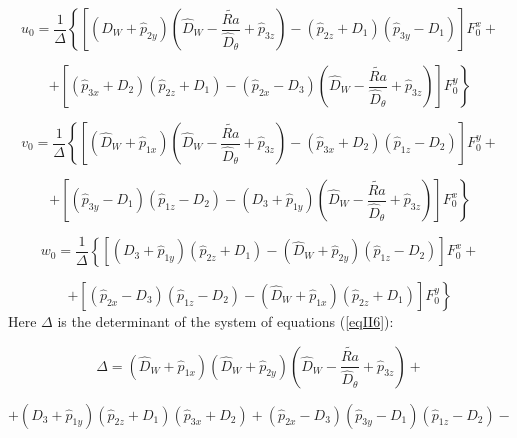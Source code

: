\documentclass [12pt]{article}
\begin{document}
\[u_{0} =\frac{1}{\Delta } \left\{ \left[\left(\widehat{D}_{W} +\widehat{p}_{2y} \right)\left(\widehat{D}_{W} -\frac{\widetilde{Ra}
 }{\widehat{D}_{\theta} } +\widehat{p}_{3z} \right)-
\left(\widehat{p}_{2z} +D_{1} \right)\left(\widehat{p}_{3y} -D_{1} \right)\right]F_{0}^{x}
\right. +  \]

\begin{equation} \label{eqII8}
 \left.{+ \left[\left(\widehat{p}_{3x} +D_{2} \right)\left(\widehat{p}_{2z} +D_{1} \right)-
\left(\widehat{p}_{2x} -D_{3} \right)\left(\widehat{D}_{W} -\frac{\widetilde{Ra}}{\widehat{D}_{\theta} } +\widehat{p}_{3z} \right) \right]F_{0}^{y}
} \right\}
\end{equation}

\[ v_{0} =\frac{1}{\Delta } \left\{ \left[\left(\widehat{D}_{W}+\widehat{p}_{1x} \right)\left(\widehat{D}_{W} -\frac{\widetilde{Ra}
 }{\widehat{D}_{\theta} } +\widehat{p}_{3z} \right)-
\left(\widehat{p}_{3x} +D_{2} \right)\left(\widehat{p}_{1z} -D_{2} \right) \right]F_{0}^{y}
+ \right.\]

\begin{equation} \label{eqII9} \left. {+\left[\left(\widehat{p}_{3y} -D_{1} \right) \left(\widehat{p}_{1z} -D_{2} \right)-
\left(D_{3} +\widehat{p}_{1y} \right)\left(\widehat{D}_{W} -\frac{\widetilde{Ra} }{\widehat{D}_{\theta} } +\widehat{p}_{3z} \right) \right]F_{0}^{x}
} \right\} \end{equation}

\[ w_{0} =\frac{1}{\Delta } \left\{ \left[\left(D_{3} +\widehat{p}_{1y} \right)\left(\widehat{p}_{2z} +D_{1} \right)-\left(
\widehat{D}_{W} +\widehat{p}_{2y} \right)\left(\widehat{p}_{1z} -D_{2} \right) \right]F_{0}^{x} + \right.\]


\begin{equation} \label{eqII10}
\left.{+\left[\left(\widehat{p}_{2x} -D_{3} \right)\left(\widehat{p}_{1z} -D_{2} \right)-
\left(\widehat{D}_{W} +\widehat{p}_{1x} \right)\left(\widehat{p}_{2z} +D_{1} \right)
\right]F_{0}^{y} }\right\}
\end{equation}
Here  $\Delta $ is the determinant of the system of equations (\ref{eqII6}):

\[\Delta =\left(\widehat{D}_{W} +\widehat{p}_{1x} \right)\left(\widehat{D}_{W} +\widehat{p}_{2y} \right)\left(\widehat{D}_{W} -\frac{\widetilde{Ra} }{\widehat{D}_{\theta} } +\widehat{p}_{3z} \right)+\]

\[+\left(D_{3} +\widehat{p}_{1y} \right)\left(\widehat{p}_{2z} +D_{1} \right)\left(
\widehat{p}_{3x} +D_{2} \right)+\left(\widehat{p}_{2x} -D_{3} \right)\left(\widehat{p}_{3y}
-D_{1} \right)\left(\widehat{p}_{1z} -D_{2} \right)-\]
\end{document}
